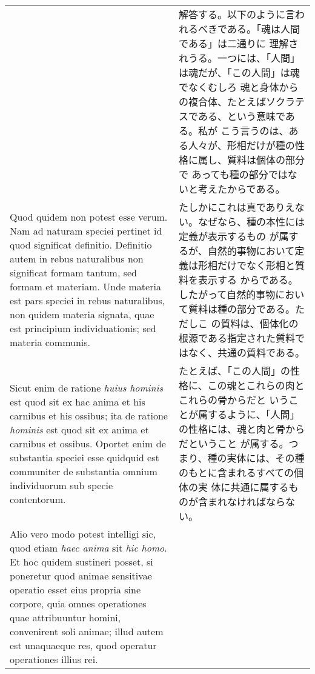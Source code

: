 \documentclass[10pt]{jsarticle} %
\begin{document}
\begin{longtable}{p{21em}p{21em}}
&

解答する。以下のように言われるべきである。「魂は人間である」は二通りに
理解されうる。一つには、「人間」は魂だが、「この人間」は魂でなくむしろ
魂と身体からの複合体、たとえばソクラテスである、という意味である。私が
こう言うのは、ある人々が、形相だけが種の性格に属し、質料は個体の部分で
あっても種の部分ではないと考えたからである。

\\



Quod quidem non potest esse verum. Nam ad naturam speciei pertinet id
quod significat definitio. Definitio autem in rebus naturalibus non
significat formam tantum, sed formam et materiam. Unde materia est
pars speciei in rebus naturalibus, non quidem materia signata, quae
est principium individuationis; sed materia communis.

&

たしかにこれは真でありえない。なぜなら、種の本性には定義が表示するもの
が属するが、自然的事物において定義は形相だけでなく形相と質料を表示する
からである。したがって自然的事物において質料は種の部分である。ただしこ
の質料は、個体化の根源である指定された質料ではなく、共通の質料である。


\\


Sicut enim de ratione {\itshape huius hominis} est quod sit ex hac
anima et his carnibus et his ossibus; ita de ratione {\itshape
hominis} est quod sit ex anima et carnibus et ossibus. Oportet enim de
substantia speciei esse quidquid est communiter de substantia omnium
individuorum sub specie contentorum.


&

たとえば、「この人間」の性格に、この魂とこれらの肉とこれらの骨からだと
いうことが属するように、「人間」の性格には、魂と肉と骨からだということ
が属する。つまり、種の実体には、その種のもとに含まれるすべての個体の実
体に共通に属するものが含まれなければならない。

\\



Alio vero modo potest intelligi sic, quod etiam {\itshape haec anima}
sit {\itshape hic homo}. Et hoc quidem sustineri posset, si poneretur
quod animae sensitivae operatio esset eius propria sine corpore, quia
omnes operationes quae attribuuntur homini, convenirent soli animae;
illud autem est unaquaeque res, quod operatur operationes illius rei.


&


\end{longtable}
\end{document}
